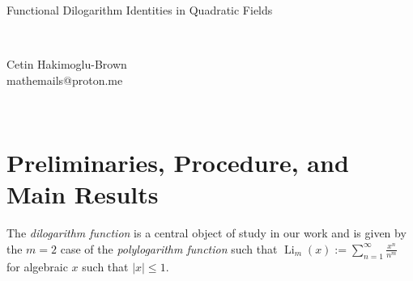 \documentclass[12pt]{article}
\begin{document}
\begin{center}
{\Large Functional Dilogarithm Identities in Quadratic Fields}

 \  

Cetin Hakimoglu-Brown\\
mathemails@proton.me

 \ 

\end{center}

\begin{abstract}
We derive three- and six-term functional dilogarithm identities whose arguments lie in
$\mathbb{Q}(u,\sqrt{4-3u^2})$ and $\mathbb{Q}(u,\sqrt{u(4-3u)})$. Our approach is based on
an integral-to-${}_4F_3$ correspondence that converts families of cubic and sextic
integrals into hypergeometric identities, providing a systematic method for constructing
functional equations for the dilogarithm over quadratic fields. We demonstrate the power
of this method by giving an analytic proof of the classical Loxton--Lewin
$2\cos(4\pi/9)$ identity, deriving a new family of dilogarithm ladders of quartic base
lying in $\mathbb{Q}(\sqrt{33})$, and proving conjectural two-term identities of Bytsko. As
a further application, we obtain rapidly convergent ${}_4F_3$ series for
$\mathrm{Cl}_2(\pi/3)$ and explicit relations connecting $\mathbb{Q}(\sqrt{13})$ and
$\mathbb{Q}(\sqrt{3})$. Finally, a PSLQ-based search over palindromic quartic units, we report  new ladder relations with
arguments built from $2\tan(\pi/8)\cos(\pi/5)$ and $\tan(3\pi/20)$, analogous to known trig identities by Watson, Loxton, and Gordon–McIntosh.
\end{abstract}



\vspace{0.1in}


\vspace{0.2in}
{\small\tableofcontents}
\newpage

\section{Preliminaries, Procedure, and Main Results}\label{sec:prelim}

 \noindent The \emph{dilogarithm function} is a central object of study in our work and is given by the $m = 2$ case of the 
 \emph{polylogarithm function} such that $\operatorname{Li}_{m}(x) := \sum_{n=1}^{\infty} \frac{x^{n}}{n^m}$ for  algebraic   $x$ 
 such that $|x| \leq 1$. 
\\
 
\end{document}
